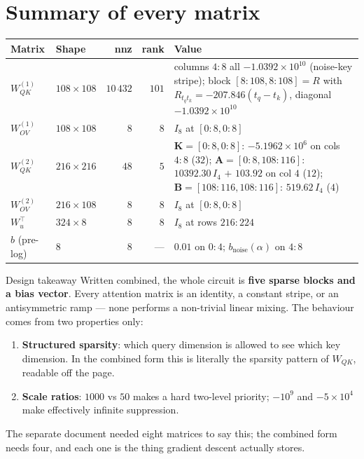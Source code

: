 \documentclass[11pt]{article}
\newcommand{\Wqk}{W_{QK}}
\newcommand{\Wov}{W_{OV}}
\begin{document}
\section{Summary of every matrix}
\begin{center}
\begin{tabular}{@{}llrrp{6.3cm}@{}}
\toprule
\textbf{Matrix} & \textbf{Shape} & \textbf{nnz} & \textbf{rank} & \textbf{Value}\\
\midrule
$\Wqk^{(1)}$ & $108\times108$ & $10\,432$ & $101$ &
 columns $4{:}8$ all $-1.0392{\times}10^{10}$ (noise-key stripe); block $[8{:}108,8{:}108]=R$ with
 $R_{t_q t_k}=-207.846(t_q-t_k)$, diagonal $-1.0392{\times}10^{10}$\\
$\Wov^{(1)}$ & $108\times108$ & $8$ & $8$ & $I_8$ at $[0{:}8,0{:}8]$\\
\midrule
$\Wqk^{(2)}$ & $216\times216$ & $48$ & $5$ &
 $\bm{K}=[0{:}8,0{:}8]$: $-5.1962{\times}10^{6}$ on cols $4{:}8$ ($32$);
 $\bm{A}=[0{:}8,108{:}116]$: $10392.30\,I_4$ $+$ $103.92$ on col $4$ ($12$);
 $\bm{B}=[108{:}116,108{:}116]$: $519.62\,I_4$ ($4$)\\
$\Wov^{(2)}$ & $216\times108$ & $8$ & $8$ & $I_8$ at $[0{:}8,0{:}8]$\\
\midrule
$W_u^\top$ & $324\times8$ & $8$ & $8$ & $I_8$ at rows $216{:}224$\\
$b$ (pre-log) & $8$ & $8$ & --- & $0.01$ on $0{:}4$; $b_{\mathrm{noise}}(\alpha)$ on $4{:}8$\\
\bottomrule
\end{tabular}
\end{center}

\begin{warningbox}{Design takeaway}
Written combined, the whole circuit is \textbf{five sparse blocks and a bias vector}. Every
attention matrix is an identity, a constant stripe, or an antisymmetric ramp --- none performs a
non-trivial linear mixing. The behaviour comes from two properties only:
\begin{enumerate}
\item \textbf{Structured sparsity}: which query dimension is allowed to see which key dimension.
In the combined form this is literally the sparsity pattern of $\Wqk$, readable off the page.
\item \textbf{Scale ratios}: $1000$ vs $50$ makes a hard two-level priority; $-10^9$ and
$-5\times10^{4}$ make effectively infinite suppression.
\end{enumerate}
The separate document needed eight matrices to say this; the combined form needs four, and each
one is the thing gradient descent actually stores.
\end{warningbox}
\end{document}
